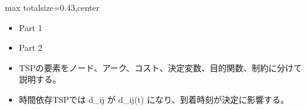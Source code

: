 \clearpage
{}
\begin{minipage}[t]{0.405\textwidth}
\begin{adjustbox}{max totalsize={\textwidth}{0.43\textheight},center}
\begin{minipage}{\textwidth}\scriptsize
{}\begin{itemize}
\item Part 1
\item Part 2
\end{itemize}\begin{itemize}
\item TSPの要素をノード、アーク、コスト、決定変数、目的関数、制約に分けて説明する。
\item 時間依存TSPでは d\_ij が d\_ij(t) になり、到着時刻が決定に影響する。
\end{itemize}
\end{minipage}
\end{adjustbox}
\end{minipage}\hfill
